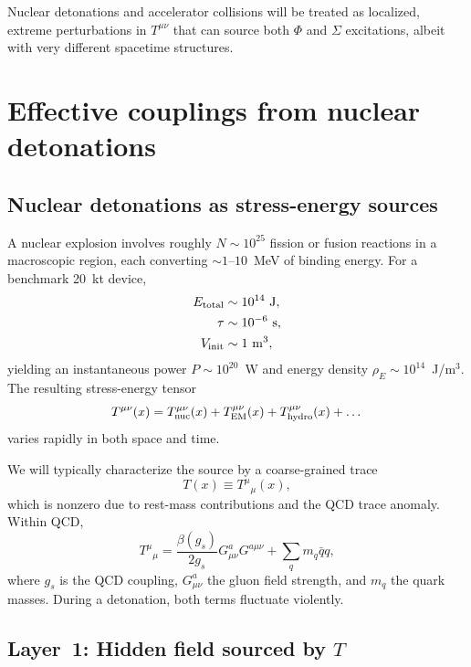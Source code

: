 \documentclass[aps,prd,twocolumn,nofootinbib,superscriptaddress]{revtex4-2}
\begin{document}
Nuclear detonations and accelerator collisions will be treated as localized, extreme perturbations in $T^{\mu\nu}$ that can source both $\Phi$ and $\Sigma$ excitations, albeit with very different spacetime structures.

\section{Effective couplings from nuclear detonations}
\label{sec:couplings}

\subsection{Nuclear detonations as stress-energy sources}

A nuclear explosion involves roughly $N \sim 10^{25}$ fission or fusion reactions in a macroscopic region, each converting $\sim\!1$--$10$~MeV of binding energy. For a benchmark 20~kt device,
\begin{align}
    E_{\rm total} &\sim 10^{14}~{\rm J}, \\
    \tau &\sim 10^{-6}~{\rm s}, \\
    V_{\rm init} &\sim 1~{\rm m}^3,
\end{align}
yielding an instantaneous power $P \sim 10^{20}$~W and energy density $\rho_E \sim 10^{14}$~J/m$^3$. The resulting stress-energy tensor
\begin{equation}
    T^{\mu\nu}(x) = T^{\mu\nu}_{\rm nuc}(x) + T^{\mu\nu}_{\rm EM}(x) + T^{\mu\nu}_{\rm hydro}(x) + \dots
\end{equation}
varies rapidly in both space and time.

We will typically characterize the source by a coarse-grained trace
\begin{equation}
    T(x) \equiv T^\mu{}_\mu(x),
\end{equation}
which is nonzero due to rest-mass contributions and the QCD trace anomaly. Within QCD,
\begin{equation}
    T^\mu{}_\mu = \frac{\beta(g_s)}{2 g_s} G^a_{\mu\nu} G^{a\mu\nu} + \sum_q m_q \bar{q} q,
\end{equation}
where $g_s$ is the QCD coupling, $G^a_{\mu\nu}$ the gluon field strength, and $m_q$ the quark masses. During a detonation, both terms fluctuate violently.

\subsection{Layer~1: Hidden field sourced by $T$}
\label{subsec:layer1_coupling}
\end{document}
